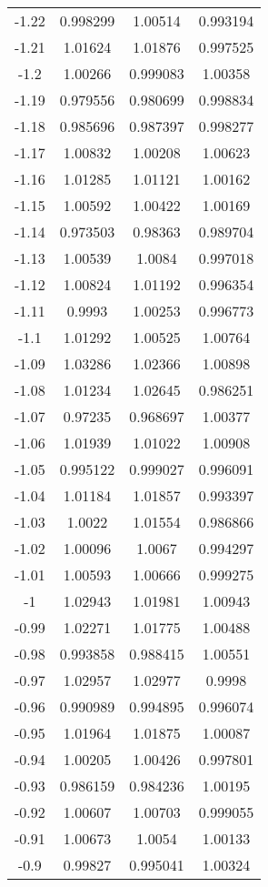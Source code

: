 \begin{table}[h!]
\begin{tabular}{|c|c|c|c|}
-1.22 & 0.998299 & 1.00514 & 0.993194 \\
-1.21 & 1.01624 & 1.01876 & 0.997525 \\
-1.2 & 1.00266 & 0.999083 & 1.00358 \\
-1.19 & 0.979556 & 0.980699 & 0.998834 \\
-1.18 & 0.985696 & 0.987397 & 0.998277 \\
-1.17 & 1.00832 & 1.00208 & 1.00623 \\
-1.16 & 1.01285 & 1.01121 & 1.00162 \\
-1.15 & 1.00592 & 1.00422 & 1.00169 \\
-1.14 & 0.973503 & 0.98363 & 0.989704 \\
-1.13 & 1.00539 & 1.0084 & 0.997018 \\
-1.12 & 1.00824 & 1.01192 & 0.996354 \\
-1.11 & 0.9993 & 1.00253 & 0.996773 \\
-1.1 & 1.01292 & 1.00525 & 1.00764 \\
-1.09 & 1.03286 & 1.02366 & 1.00898 \\
-1.08 & 1.01234 & 1.02645 & 0.986251 \\
-1.07 & 0.97235 & 0.968697 & 1.00377 \\
-1.06 & 1.01939 & 1.01022 & 1.00908 \\
-1.05 & 0.995122 & 0.999027 & 0.996091 \\
-1.04 & 1.01184 & 1.01857 & 0.993397 \\
-1.03 & 1.0022 & 1.01554 & 0.986866 \\
-1.02 & 1.00096 & 1.0067 & 0.994297 \\
-1.01 & 1.00593 & 1.00666 & 0.999275 \\
-1 & 1.02943 & 1.01981 & 1.00943 \\
-0.99 & 1.02271 & 1.01775 & 1.00488 \\
-0.98 & 0.993858 & 0.988415 & 1.00551 \\
-0.97 & 1.02957 & 1.02977 & 0.9998 \\
-0.96 & 0.990989 & 0.994895 & 0.996074 \\
-0.95 & 1.01964 & 1.01875 & 1.00087 \\
-0.94 & 1.00205 & 1.00426 & 0.997801 \\
-0.93 & 0.986159 & 0.984236 & 1.00195 \\
-0.92 & 1.00607 & 1.00703 & 0.999055 \\
-0.91 & 1.00673 & 1.0054 & 1.00133 \\
-0.9 & 0.99827 & 0.995041 & 1.00324 \\

\end{tabular}
\end{table}
